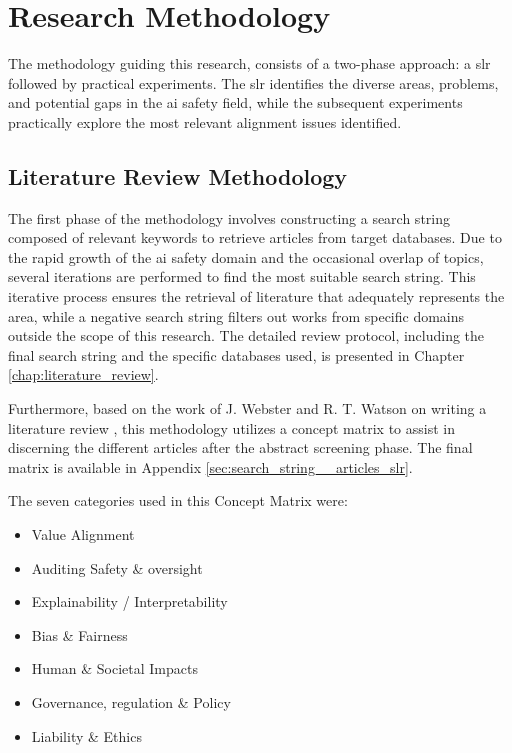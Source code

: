 \chapter{Research Methodology}\label{research_methodology}

\begin{reviewed}

	The methodology guiding this research, consists of a two-phase approach: a \gls{slr} followed by practical experiments. The \gls{slr} identifies the diverse areas, problems, and potential gaps in the \gls{ai} safety field, while the subsequent experiments practically explore the most relevant alignment issues identified.

	\section{Literature Review Methodology}

	The first phase of the methodology involves constructing a search string composed of relevant keywords to retrieve articles from target databases. Due to the rapid growth of the \gls{ai} safety domain and the occasional overlap of topics, several iterations are performed to find the most suitable search string. This iterative process ensures the retrieval of literature that adequately represents the area, while a negative search string filters out works from specific domains outside the scope of this research. The detailed review protocol, including the final search string and the specific databases used, is presented in Chapter \ref{chap:literature_review}.

	Furthermore, based on the work of J. Webster and R. T. Watson on writing a literature review \cite{webster_analyzing_2002}, this methodology utilizes a concept matrix to assist in discerning the different articles after the abstract screening phase. The final matrix is available in Appendix \ref{sec:search_string__articles_slr}.

\begin{toreview}

	The seven categories used in this Concept Matrix were:
	\begin{itemize}
		\item Value Alignment
		\item Auditing Safety \& oversight
		\item Explainability / Interpretability
		\item Bias \& Fairness
		\item Human \& Societal Impacts
		\item Governance, regulation \& Policy
		\item Liability \& Ethics
	\end{itemize}
	

\end{toreview}
\end{reviewed}
